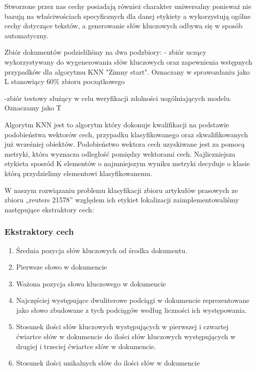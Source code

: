 \documentclass{classrep}
\begin{document}
Stworzone przez nas cechy posiadają również charakter uniwersalny ponieważ nie bazują na właściwościach specyficznych dla danej etykiety a wykorzystują ogólne cechy dotyczące tekstów, a generowanie słów kluczowych odbywa się w sposób automatyczny.


Zbiór dokumentów podzieliliśmy na dwa podzbiory:
- zbiór uczący wykorzystywany do wygenerowania słów kluczowych oraz zapewnienia wstępnych przypadków dla algorytmu KNN "Zimny start". Oznaczany w sprawozdaniu jako L stanowiący 60\% zbioru początkowego


-zbiór testowy służący w celu weryfikacji zdolności uogólniających modelu. Oznaczamy jako T

Algorytm KNN jest to algorytm który dokonuje kwalifikacji na podstawie podobieństwa wektorów cech, przypadku klasyfikowanego oraz skwalifikowanych już wcześniej obiektów.
Podobieństwo wektora cech uzyskiwane jest za pomocą metryki, która wyznacza odległość pomiędzy wektorami cech.
Najliczniejsza etykieta sposród K elementów o najmniejszym wyniku metryki decyduje o klasie którą przydzielimy elementowi klasyfikowanemu.


W naszym rozwiązaniu problemu klasyfikacji zbioru artykułów prasowych ze zbioru „reuters 21578” względem ich etykiet lokalizacji zaimplementowaliśmy następujące ekstraktory cech:
\subsubsection{Ekstraktory cech}
\begin{enumerate}
  \item Średnia pozycja słów kluczowych od środka dokumentu.

  \item Pierwsze słowo w dokumencie
  \item Ważona pozycja słowa kluczowego w dokumencie
   \item Najczęściej występujące dwuliterowe podciągi w dokumencie
reprezentowane jako słowo zbudowane z tych podciągów według liczności ich występowania.

  \item Stosunek ilości słów kluczowych występujących w pierwszej i czwartej ćwiartce słów w dokumencie do ilości słów kluczowych występujących w drugiej i trzeciej ćwiartce słów w dokumencie.
  
    \item Stosunek ilości unikalnych słów do ilości słów w dokumencie
\end{enumerate}
\end{document}
